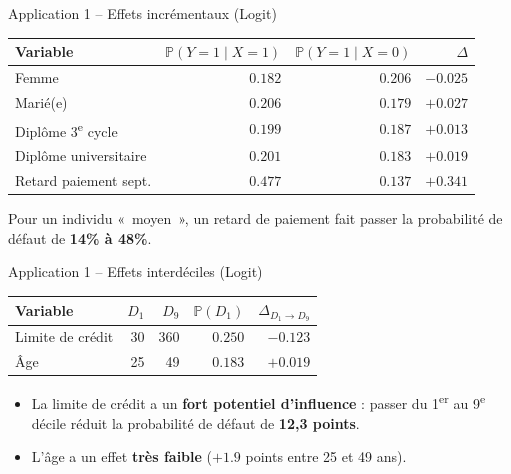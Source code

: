 \documentclass[11pt,aspectratio=169]{beamer}
\newcommand{\PP}{\mathbb{P}}
\begin{document}
\begin{frame}{Application 1 -- Effets incrémentaux (Logit)}

\begin{center}
    \small
    \renewcommand{\arraystretch}{1.3}
    \begin{tabular}{lrrr}
        \toprule
        \textbf{Variable} & $\PP(Y=1 \mid X=1)$ & $\PP(Y=1 \mid X=0)$ & $\Delta$ \\
        \midrule
        Femme & $0.182$ & $0.206$ & $-0.025$ \\
        Marié(e) & $0.206$ & $0.179$ & $+0.027$ \\
        Diplôme 3\textsuperscript{e} cycle & $0.199$ & $0.187$ & $+0.013$ \\
        Diplôme universitaire & $0.201$ & $0.183$ & $+0.019$ \\
        Retard paiement sept. & $0.477$ & $0.137$ & $+0.341$ \\
        \bottomrule
    \end{tabular}
\end{center}

Pour un individu «~moyen~», un retard de paiement fait passer la
probabilité de défaut de \textbf{14\% à 48\%}.

\end{frame}

\begin{frame}{Application 1 -- Effets interdéciles (Logit)}

\begin{center}
    \small
    \renewcommand{\arraystretch}{1.3}
    \begin{tabular}{lrrrr}
        \toprule
        \textbf{Variable} & $D_1$ & $D_9$ & $\PP(D_1)$ & $\Delta_{D_1 \to D_9}$ \\
        \midrule
        Limite de crédit & 30 & 360 & $0.250$ & $-0.123$ \\
        Âge & 25 & 49 & $0.183$ & $+0.019$ \\
        \bottomrule
    \end{tabular}
\end{center}

\begin{itemize}

\item La limite de crédit a un \textbf{fort potentiel d'influence} :
  passer du 1\textsuperscript{er} au 9\textsuperscript{e} décile réduit la
  probabilité de défaut de \textbf{12,3 points}.\newline

\item L'âge a un effet \textbf{très faible} ($+1.9$ points entre 25 et
  49 ans).

\end{itemize}

\end{frame}
\end{document}
